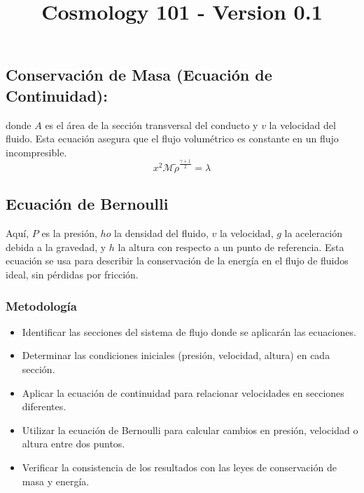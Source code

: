 \documentclass{article}\usepackage{graphicx} \usepackage{amsmath} \usepackage{colortbl}\title{Cosmology 101 - Version 0.1}
\begin{document}
\subsection{Conservación de Masa (Ecuación de Continuidad):}
donde $A$ es el área de la sección transversal del conducto y $v$ la velocidad del fluido. Esta ecuación asegura que el flujo volumétrico es constante en un flujo incompresible. \begin{equation}x^2 \mathcal{M} \tilde{\rho }^{\frac{\gamma +1}{2}}=\lambda \label{ber1} \end{equation}\subsection{Ecuación de Bernoulli}
Aquí, $P$ es la presión, $
ho$ la densidad del fluido, $v$ la velocidad, $g$ la aceleración debida a la gravedad, y $h$ la altura con respecto a un punto de referencia. Esta ecuación se usa para describir la conservación de la energía en el flujo de fluidos ideal, sin pérdidas por fricción.
\subsubsection{Metodología}
\begin{itemize}
\item Identificar las secciones del sistema de flujo donde se aplicarán las ecuaciones.
\item Determinar las condiciones iniciales (presión, velocidad, altura) en cada sección.
\item Aplicar la ecuación de continuidad para relacionar velocidades en secciones diferentes.
\item Utilizar la ecuación de Bernoulli para calcular cambios en presión, velocidad o altura entre dos puntos.
\item Verificar la consistencia de los resultados con las leyes de conservación de masa y energía.
\end{itemize}
\end{document}
